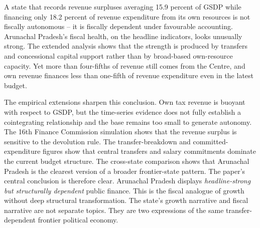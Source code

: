 \documentclass[11pt,a4paper]{article}
\begin{document}
A state that records revenue surpluses averaging 15.9 percent of GSDP while financing only 18.2 percent of revenue expenditure from its own resources is not fiscally autonomous -- it is fiscally dependent under favourable accounting. Arunachal Pradesh's fiscal health, on the headline indicators, looks unusually strong. The extended analysis shows that the strength is produced by transfers and concessional capital support rather than by broad-based own-resource capacity. Yet more than four-fifths of revenue still comes from the Centre, and own revenue finances less than one-fifth of revenue expenditure even in the latest budget.

The empirical extensions sharpen this conclusion. Own tax revenue is buoyant with respect to GSDP, but the time-series evidence does not fully establish a cointegrating relationship and the base remains too small to generate autonomy. The 16th Finance Commission simulation shows that the revenue surplus is sensitive to the devolution rule. The transfer-breakdown and committed-expenditure figures show that central transfers and salary commitments dominate the current budget structure. The cross-state comparison shows that Arunachal Pradesh is the clearest version of a broader frontier-state pattern. The paper's central conclusion is therefore clear. Arunachal Pradesh displays \emph{headline-strong but structurally dependent} public finance. This is the fiscal analogue of growth without deep structural transformation. The state's growth narrative and fiscal narrative are not separate topics. They are two expressions of the same transfer-dependent frontier political economy.
\end{document}
